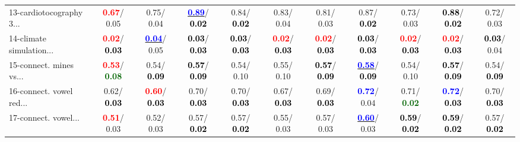 \begin{table}[h]
\begin{center}
{\begin{tabular}{lc|c|c|c|c|c|c|c|c|c}
13-cardiotocography 3... & \textcolor{red}{\textbf{  0.67}}/  0.05 &   0.75/  0.04 & \underline{\textcolor{blue}{\textbf{  0.89}}}/\textcolor{black}{\textbf{  0.02}} &   0.84/\textcolor{black}{\textbf{  0.02}} &   0.83/  0.04 &   0.81/  0.03 &   0.87/\textcolor{black}{\textbf{  0.02}} &   0.73/  0.03 & \textcolor{black}{\textbf{  0.88}}/\textcolor{black}{\textbf{  0.02}} &   0.72/  0.03 \\
14-climate simulation... & \textcolor{red}{\textbf{  0.02}}/\textcolor{black}{\textbf{  0.03}} & \underline{\textcolor{blue}{\textbf{  0.04}}}/  0.05 & \textcolor{black}{\textbf{  0.03}}/\textcolor{black}{\textbf{  0.03}} & \textcolor{black}{\textbf{  0.03}}/\textcolor{black}{\textbf{  0.03}} & \textcolor{red}{\textbf{  0.02}}/\textcolor{black}{\textbf{  0.03}} & \textcolor{red}{\textbf{  0.02}}/\textcolor{black}{\textbf{  0.03}} & \textcolor{black}{\textbf{  0.03}}/\textcolor{black}{\textbf{  0.03}} & \textcolor{red}{\textbf{  0.02}}/\textcolor{black}{\textbf{  0.03}} & \textcolor{red}{\textbf{  0.02}}/\textcolor{black}{\textbf{  0.03}} & \textcolor{black}{\textbf{  0.03}}/  0.04 \\ \hline
15-connect. mines vs... & \textcolor{red}{\textbf{  0.53}}/\textcolor{darkgreen}{\textbf{  0.08}} &   0.54/\textcolor{black}{\textbf{  0.09}} & \textcolor{black}{\textbf{  0.57}}/\textcolor{black}{\textbf{  0.09}} &   0.54/  0.10 &   0.55/  0.10 & \textcolor{black}{\textbf{  0.57}}/\textcolor{black}{\textbf{  0.09}} & \underline{\textcolor{blue}{\textbf{  0.58}}}/\textcolor{black}{\textbf{  0.09}} &   0.54/  0.10 & \textcolor{black}{\textbf{  0.57}}/\textcolor{black}{\textbf{  0.09}} &   0.54/\textcolor{black}{\textbf{  0.09}} \\
16-connect. vowel red... &   0.62/\textcolor{black}{\textbf{  0.03}} & \textcolor{red}{\textbf{  0.60}}/\textcolor{black}{\textbf{  0.03}} &   0.70/\textcolor{black}{\textbf{  0.03}} &   0.70/\textcolor{black}{\textbf{  0.03}} &   0.67/\textcolor{black}{\textbf{  0.03}} &   0.69/\textcolor{black}{\textbf{  0.03}} & \textcolor{blue}{\textbf{  0.72}}/  0.04 &   0.71/\textcolor{darkgreen}{\textbf{  0.02}} & \textcolor{blue}{\textbf{  0.72}}/\textcolor{black}{\textbf{  0.03}} &   0.70/\textcolor{black}{\textbf{  0.03}} \\
17-connect. vowel... & \textcolor{red}{\textbf{  0.51}}/  0.03 &   0.52/  0.03 &   0.57/\textcolor{black}{\textbf{  0.02}} &   0.57/\textcolor{black}{\textbf{  0.02}} &   0.55/  0.03 &   0.57/  0.03 & \underline{\textcolor{blue}{\textbf{  0.60}}}/  0.03 & \textcolor{black}{\textbf{  0.59}}/\textcolor{black}{\textbf{  0.02}} & \textcolor{black}{\textbf{  0.59}}/\textcolor{black}{\textbf{  0.02}} &   0.57/\textcolor{black}{\textbf{  0.02}} \\

\end{tabular}}
\end{center}
\end{table}
